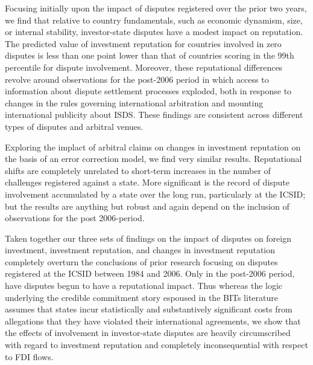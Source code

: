\documentclass[12pt,onesided]{amsart}
\begin{document}
Focusing initially upon the impact of disputes registered over the prior two years, we find that relative to country fundamentals, such as economic dynamism, size, or internal stability, investor-state disputes have a modest impact on reputation. The predicted value of investment reputation for countries involved in zero disputes is less than one point lower than that of countries scoring in the 99th percentile for dispute involvement. Moreover, these reputational differences revolve around observations for the post-2006 period in which access to information about dispute settlement processes exploded, both in response to changes in the rules governing international arbitration and mounting international publicity about ISDS. These findings are consistent across different types of disputes and arbitral venues. 

Exploring the implact of arbitral claims on changes in investment reputation on the basis of an error correction model, we find very similar results. Reputational shifts are completely unrelated to short-term increases in the number of challenges registered against a state. More significant is the record of dispute involvement accumulated by a state over the long run, particularly at the ICSID; but the results are anything but robust and again depend on the inclusion of observations for the post 2006-period. 

Taken together our three sets of findings on the impact of disputes on foreign investment, investment reputation, and changes in investment reputation completely overturn the conclusions of prior research focusing on disputes registered at the ICSID between 1984 and 2006. Only in the post-2006 period, have disputes begun to have a reputational impact. Thus whereas the logic underlying the credible commitment story espoused in the BITs literature assumes that states incur statistically and substantively significant costs from allegations that they have violated their international agreements, we show that the effects of involvement in investor-state disputes are heavily circumscribed with regard to investment reputation and completely inconsequential with respect to FDI flows. 
\end{document}
